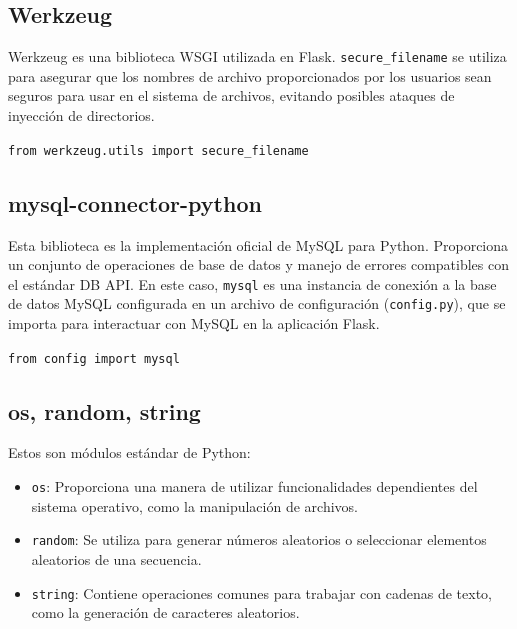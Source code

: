 \documentclass[a4paper, 12pt]{book}
\begin{document}
\subsection{Werkzeug}
Werkzeug es una biblioteca WSGI utilizada en Flask. \texttt{secure\_filename} se utiliza para asegurar que los nombres de archivo proporcionados por los usuarios sean seguros para usar en el sistema de archivos, evitando posibles ataques de inyección de directorios.
\begin{center}
  \texttt{from werkzeug.utils import secure\_filename}
\end{center}
\subsection{mysql-connector-python}
 Esta biblioteca es la implementación oficial de MySQL para Python. Proporciona un conjunto de operaciones de base de datos y manejo de errores compatibles con el estándar DB API. En este caso, \texttt{mysql} es una instancia de conexión a la base de datos MySQL configurada en un archivo de configuración (\texttt{config.py}), que se importa para interactuar con MySQL en la aplicación Flask.
\begin{center}
  \texttt{from config import mysql}
\end{center}
\subsection{os, random, string}
Estos son módulos estándar de Python:
\begin{itemize}
  \item \texttt{os}: Proporciona una manera de utilizar funcionalidades dependientes del sistema operativo, como la manipulación de archivos.
  \item \texttt{random}: Se utiliza para generar números aleatorios o seleccionar elementos aleatorios de una secuencia.
  \item \texttt{string}: Contiene operaciones comunes para trabajar con cadenas de texto, como la generación de caracteres aleatorios.
\end{itemize}
\end{document}
